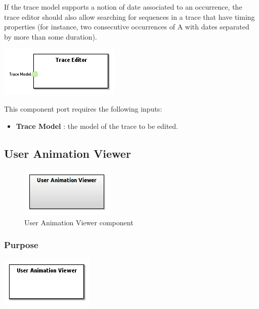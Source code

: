 \documentclass{gemoc} %
\begin{document}
If the trace model supports a notion of date associated to an occurrence, the trace editor should also allow searching for sequences in a trace that have timing properties (for instance, two consecutive occurrences of A with dates separated by more than some duration).
\begin{center}
\includegraphics*[trim=0.0cm 0.0cm 0cm 0.0cm, clip=true]{../images/generated/Generated_Trace_Editor.png}
\end{center}

This component port requires the following inputs:
\begin{itemize}
  \item \textbf{Trace Model} :
the model of the trace to be edited.
\end{itemize}


\subsection{User Animation Viewer}

\begin{figure}[htp]
	\begin{center}
	\includegraphics*[trim=0.0cm 0.0cm 0cm 0.0cm, clip=true, scale=1.0]{../images/generated/Generated_User Animation Viewer.jpg}
	\caption{User Animation Viewer component}
	\end{center}
\end{figure}

\subsubsection{Purpose}

\begin{center}
\includegraphics*[trim=0.0cm 0.0cm 0cm 0.0cm, clip=true]{../images/generated/Generated_User_Animation_Viewer.png}
\end{center}
\end{document}

